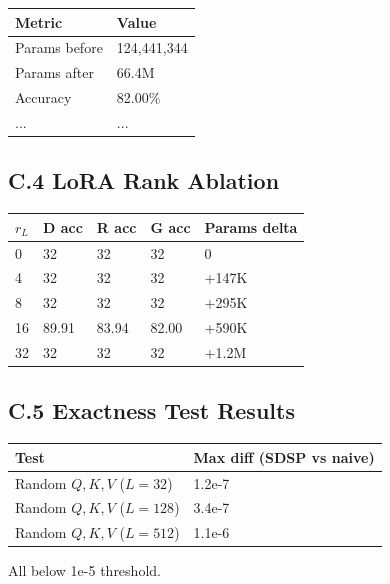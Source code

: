 \begin{table}[H]
\centering
\small
\begin{tabular}{ll}
\toprule
\textbf{Metric} & \textbf{Value} \\
\midrule
Params before & 124,441,344 \\
Params after & 66.4M \\
Accuracy & 82.00\% \\
... & ... \\
\bottomrule
\end{tabular}
\end{table}

\subsection{C.4 LoRA Rank Ablation}

\begin{table}[H]
\centering
\small
\begin{tabular}{lllll}
\toprule
\textbf{$r_L$} & \textbf{D acc} & \textbf{R acc} & \textbf{G acc} & \textbf{Params delta} \\
\midrule
0 & 32 & 32 & 32 & 0 \\
4 & 32 & 32 & 32 & +147K \\
8 & 32 & 32 & 32 & +295K \\
16 & 89.91 & 83.94 & 82.00 & +590K \\
32 & 32 & 32 & 32 & +1.2M \\
\bottomrule
\end{tabular}
\end{table}

\subsection{C.5 Exactness Test Results}

\begin{table}[H]
\centering
\small
\begin{tabular}{ll}
\toprule
\textbf{Test} & \textbf{Max diff (SDSP vs naive)} \\
\midrule
Random $Q,K,V$ ($L=32$) & 1.2e-7 \\
Random $Q,K,V$ ($L=128$) & 3.4e-7 \\
Random $Q,K,V$ ($L=512$) & 1.1e-6 \\
\bottomrule
\end{tabular}
\end{table}

All below 1e-5 threshold.

